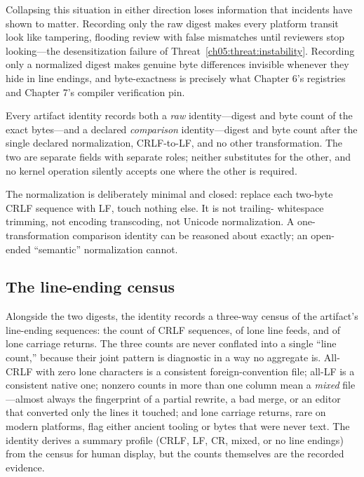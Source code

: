 Collapsing this situation in either direction loses information that
incidents have shown to matter. Recording only the raw digest makes every
platform transit look like tampering, flooding review with false
mismatches until reviewers stop looking---the desensitization failure of
Threat~\ref{ch05:threat:instability}. Recording only a normalized digest
makes genuine byte differences invisible whenever they hide in line
endings, and byte-exactness is precisely what Chapter 6's registries and
Chapter 7's compiler verification pin.

\begin{ruleenv}\label{ch05:rule:dual}
Every artifact identity records both a \emph{raw} identity---digest and
byte count of the exact bytes---and a declared \emph{comparison}
identity---digest and byte count after the single declared normalization,
CRLF-to-LF, and no other transformation. The two are separate fields with
separate roles; neither substitutes for the other, and no kernel operation
silently accepts one where the other is required.
\end{ruleenv}

The normalization is deliberately minimal and closed: replace each
two-byte CRLF sequence with LF, touch nothing else. It is not trailing-
whitespace trimming, not encoding transcoding, not Unicode normalization.
A one-transformation comparison identity can be reasoned about exactly;
an open-ended ``semantic'' normalization cannot.

\subsection{The line-ending census}

Alongside the two digests, the identity records a three-way census of the
artifact's line-ending sequences: the count of CRLF sequences, of lone
line feeds, and of lone carriage returns. The three counts are never
conflated into a single ``line count,'' because their joint pattern is
diagnostic in a way no aggregate is. All-CRLF with zero lone characters is
a consistent foreign-convention file; all-LF is a consistent native one;
nonzero counts in more than one column mean a \emph{mixed} file---almost
always the fingerprint of a partial rewrite, a bad merge, or an editor
that converted only the lines it touched; and lone carriage returns,
rare on modern platforms, flag either ancient tooling or bytes that were
never text. The identity derives a summary profile (CRLF, LF, CR, mixed,
or no line endings) from the census for human display, but the counts
themselves are the recorded evidence.

